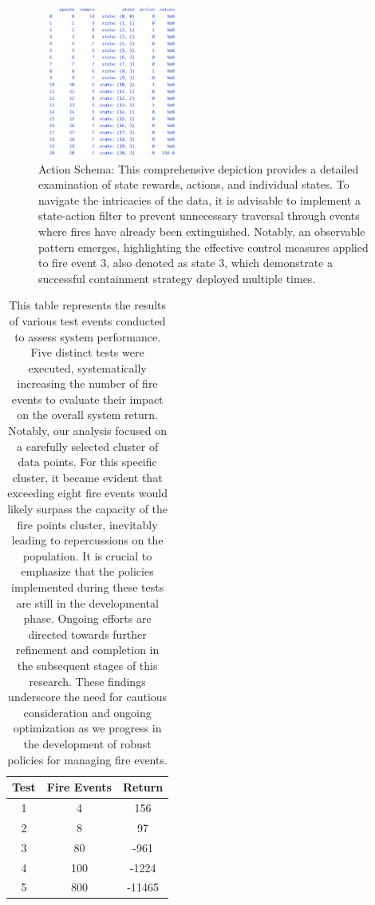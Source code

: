 \documentclass{scspaperproc}
\theoremstyle{scsthe}
\begin{document}
		
		  \begin{figure}
			\centering
			\includegraphics[height=5cm,width=5cm]{4_2000.png}
			\caption{Action Schema: This comprehensive depiction provides a detailed examination of state rewards, actions, and individual states. To navigate the intricacies of the data, it is advisable to implement a state-action filter to prevent unnecessary traversal through events where fires have already been extinguished. Notably, an observable pattern emerges, highlighting the effective control measures applied to fire event 3, also denoted as state 3, which demonstrate a successful containment strategy deployed multiple times.}\end{figure}
		  
		  
		
  
			\begin{table}
			  \centering
			  \caption{This table represents the results of various test events conducted to assess system performance. Five distinct tests were executed, systematically increasing the number of fire events to evaluate their impact on the overall system return. Notably, our analysis focused on a carefully selected cluster of data points.
			  For this specific cluster, it became evident that exceeding eight fire events would likely surpass the capacity of the fire points cluster, inevitably leading to repercussions on the population. It is crucial to emphasize that the policies implemented during these tests are still in the developmental phase. Ongoing efforts are directed towards further refinement and completion in the subsequent stages of this research.
			  These findings underscore the need for cautious consideration and ongoing optimization as we progress in the development of robust policies for managing fire events.
			  }
			  
			  
			  \begin{tabular}{|c|c|c|}
				\hline
				\textbf{Test} & \textbf{Fire Events} & \textbf{Return} \\
				\hline
				1 & 4 & 156 \\
				2 & 8 & 97 \\
				3 & 80 & -961 \\
				4 & 100 & -1224 \\
				5 & 800 & -11465 \\
				\hline
				\end{tabular}
			\end{table}
  
\end{document}
